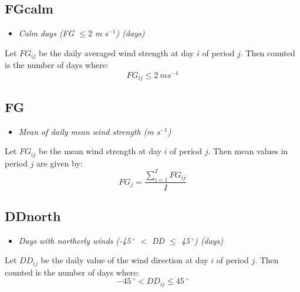 \documentclass[a4paper,11pt]{article}
\begin{document}
\subsection*{FGcalm}
\begin{itemize}
\item \textit{Calm days (FG $\le 2 $ m s$^{-1}$) (days)}
\end{itemize}
Let $FG_{ij}$ be the daily averaged wind strength at day $i$ of period
$j$. Then counted is the number of days where:
\begin{equation*}
FG_{ij} \le 2\:m s^{-1}
\end{equation*}
 
\subsection*{FG}
\begin{itemize}
\item \textit{Mean of daily mean wind strength (m s$^{-1}$)}
\end{itemize}
Let $FG_{ij}$ be the mean wind strength at day $i$ of period $j$. Then
mean values in period $j$ are given by:
\begin{equation*}
FG_{j} = \frac{\sum_{i=1}^{I}FG_{ij}}{I}
\end{equation*}


\subsection*{DDnorth}
\begin{itemize}
\item \textit{Days with northerly winds (-45$\:^{\circ}$ $<$ DD $\le$ 45$\:^\circ$) (days)}
\end{itemize}
Let $DD_{ij}$ be the daily value of the wind direction at day $i$ of period
$j$. Then counted is the number of days where:
\begin{equation*}
-45\:^\circ < DD_{ij} \le 45\:^\circ
\end{equation*}
\end{document}
